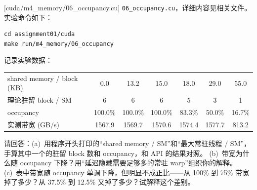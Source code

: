 \documentclass[11pt,a4paper,fontset=none]{ctexart}
\begin{document}
[cuda/m4\_memory/06\_occupancy.cu]
\texttt{06\_occupancy.cu}，详细内容见相关文件。实验命令如下：

\begin{lstlisting}
cd assignment01/cuda
make run/m4_memory/06_occupancy
\end{lstlisting}

记录实验数据：

\begin{center}\small
\begin{tabular}{@{}lcccccc@{}}
\toprule
shared memory / block (KB) & 0.0 & 13.2 & 15.0 & 18.0 & 29.0 & 55.0 \\
理论驻留 block / SM & 6 & 6 & 6 & 5 & 3 & 1 \\
occupancy & 100.0\% & 100.0\% & 100.0\% & 83.3\% & 50.0\% & 16.7\% \\
实测带宽 (GB/s) & 1567.9 & 1569.7 & 1570.6 & 1574.4 & 1577.7 & 813.2 \\
\bottomrule
\end{tabular}
\end{center}

请回答：(a)~用程序开头打印的“shared memory / SM”和“最大常驻线程 / SM”，手算其中一个的驻留 block 数和 occupancy，和 API 的结果对照。
(b)~带宽为什么随 occupancy 下降？用“延迟隐藏需要足够多的常驻 warp”组织你的解释。
(c)~表中带宽随 occupancy 单调下降，但明显不成正比——从 100\% 到 75\% 带宽掉了多少？从 37.5\% 到 12.5\% 又掉了多少？试解释这个差别。

\end{document}
